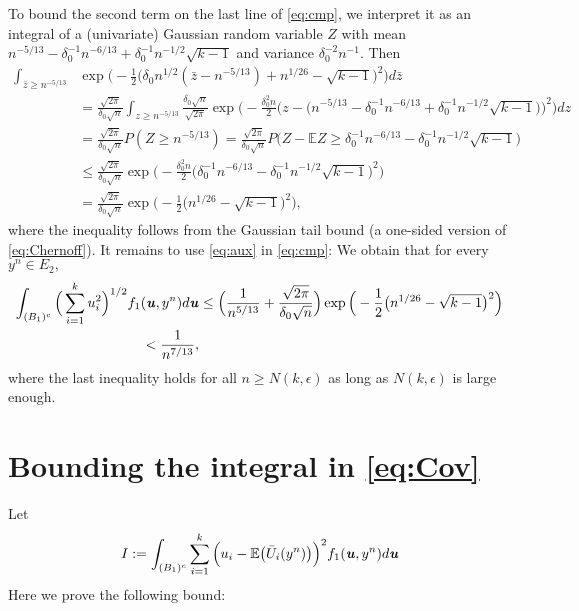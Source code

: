 \documentclass[11pt,onecolumn]{IEEEtran}
\def\mathbi#1{{\textbf{\textit #1}}}
\begin{document}
To bound the second term on the last line of \eqref{eq:cmp}, we interpret it as an integral of a (univariate) Gaussian random variable $Z$ with 
mean $n^{-5/13} - \delta_0^{-1}n^{-6/13} + \delta_0^{-1}n^{-1/2}\sqrt{k-1}$ and variance $\delta_0^{-2}n^{-1}.$ Then
   \begin{align}
 \int_{\bar{z} \ge n^{-5/13}}  &\exp\Big(-\frac{1}{2} \Big( \delta_0 n^{1/2} (\bar{z} - n^{-5/13} ) + n^{1/26}-\sqrt{k-1} \Big)^2 \Big) d \bar{z} \nonumber\\
& = \frac{\sqrt{2\pi}}{\delta_0 \sqrt{n}}
\int_{z \ge n^{-5/13}}  \frac{\delta_0 \sqrt{n}}{\sqrt{2\pi}}  \exp\Big(-\frac{\delta_0^2 n}{2} \Big( z - \big( n^{-5/13} - \delta_0^{-1} n^{-6/13} + \delta_0^{-1} n^{-1/2}\sqrt{k-1} \big) \Big)^2 \Big) d z \nonumber\\
& = \frac{\sqrt{2\pi}}{\delta_0 \sqrt{n}} P(Z\ge n^{-5/13})
= \frac{\sqrt{2\pi}}{\delta_0 \sqrt{n}} P\Big( Z - \mathbb{E} Z \ge \delta_0^{-1}n^{-6/13} - \delta_0^{-1}n^{-1/2}\sqrt{k-1} \Big)\nonumber\\ & {\le}\frac{\sqrt{2\pi}}{\delta_0 \sqrt{n}} 
\exp \Big(-\frac{\delta_0^2 n}{2} \big( \delta_0^{-1}n^{-6/13} - \delta_0^{-1}n^{-1/2}\sqrt{k-1} \big)^2  \Big) \nonumber\\
& = \frac{\sqrt{2\pi}}{\delta_0 \sqrt{n}} 
\exp \Big(-\frac{ 1 }{2} \big( n^{1/26} - \sqrt{k-1} \big)^2  \Big),\label{eq:aux}
    \end{align}
where the inequality follows from the Gaussian tail bound (a one-sided version of \eqref{eq:Chernoff}).
It remains to use \eqref{eq:aux} in \eqref{eq:cmp}: We obtain that for every $y^n \in E_2,$
   \begin{align*}
 \int_{ (B_1)^c} \Big(\sum_{i=1}^k u_i^2 \Big)^{1/2} f_1(\mathbi{u},y^n) d\mathbi{u} 
   &\le  \Big(\frac{1}{n^{5/13}} + \frac{\sqrt{2\pi}}{\delta_0 \sqrt{n}} \Big)
\exp \Big(-\frac{ 1 }{2} \big( n^{1/26} - \sqrt{k-1} \big)^2  \Big) \\
<    \frac{1}{n^{7/13}},
    \end{align*}
where the last inequality holds for all $n\ge N(k,\epsilon)$ as long as $N(k,\epsilon)$ is large enough.

\section{Bounding the integral in \eqref{eq:Cov}}\label{ap:vr}
Let 
$$
I:=\int_{ (B_1)^c} \sum_{i=1}^k \Big(u_i- \mathbb{E}\big( \bar{U}_i(y^n) \big) \Big)^2 f_1(\mathbi{u},y^n) d\mathbi{u}
$$
Here we prove the following bound:
\end{document}
